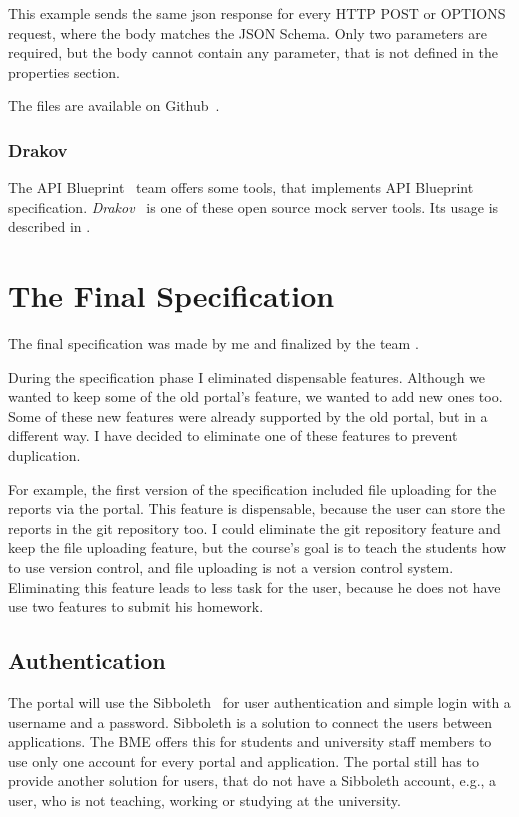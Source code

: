This example sends the same json response for every HTTP POST or OPTIONS request, where the body matches the JSON Schema. Only two parameters are required, but the body cannot contain any parameter, that is not defined in the properties section.

The files are available on Github~\cite{Github-blueprint}. 

\subsubsection{Drakov}

The API Blueprint~\cite{api-blueprint} team offers some tools, that implements API Blueprint specification. \emph{Drakov}~\cite{drakov} is one of these open source mock server tools. Its usage is described in .




\section{The Final Specification} \label{final-spec}
The final specification was made by me and finalized by the team .

During the specification phase I eliminated dispensable features. Although we wanted to keep some of the old portal's feature, we wanted to add new ones too. Some of these new features were already supported by the old portal, but in a different way. I have decided to eliminate one of these features to prevent duplication.

For example, the first version of the specification included file uploading for the reports via the portal. This feature is dispensable, because the user can store the reports in the git repository too. I could eliminate the git repository feature and keep the file uploading feature, but the course's goal is to teach the students how to use version control, and file uploading is not a version control system. Eliminating this feature leads to less task for the user, because he does not have use two features to submit his homework.

\subsection{Authentication}
The portal will use the Sibboleth~\cite{sibboleth} for user authentication and simple login with a username and a password. Sibboleth is a solution to connect the users between applications. The BME offers this for students and university staff members to use only one account for every portal and application. The portal still has to provide another solution for users, that do not have a Sibboleth account, e.g., a user, who is not teaching, working or studying at the university.

